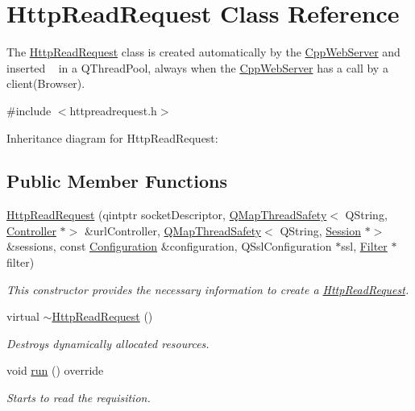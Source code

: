 \hypertarget{class_http_read_request}{}\section{Http\+Read\+Request Class Reference}
\label{class_http_read_request}


The \hyperlink{class_http_read_request}{Http\+Read\+Request} class is created automatically by the \hyperlink{class_cpp_web_server}{Cpp\+Web\+Server} and inserted ~\newline
 in a Q\+Thread\+Pool, always when the \hyperlink{class_cpp_web_server}{Cpp\+Web\+Server} has a call by a client(\+Browser).  




{\ttfamily \#include $<$httpreadrequest.\+h$>$}



Inheritance diagram for Http\+Read\+Request\+:
\subsection*{Public Member Functions}
\begin{DoxyCompactItemize}
\item 
\hyperlink{class_http_read_request_a1b3515d60b21be64bbb3afb7b5b03dcd}{Http\+Read\+Request} (qintptr socket\+Descriptor, \hyperlink{class_q_map_thread_safety}{Q\+Map\+Thread\+Safety}$<$ Q\+String, \hyperlink{class_controller}{Controller} $\ast$$>$ \&url\+Controller, \hyperlink{class_q_map_thread_safety}{Q\+Map\+Thread\+Safety}$<$ Q\+String, \hyperlink{class_session}{Session} $\ast$$>$ \&sessions, const \hyperlink{class_configuration}{Configuration} \&configuration, Q\+Ssl\+Configuration $\ast$ssl, \hyperlink{class_filter}{Filter} $\ast$filter)
\begin{DoxyCompactList}\small\item\em This constructor provides the necessary information to create a \hyperlink{class_http_read_request}{Http\+Read\+Request}. \end{DoxyCompactList}\item 
\mbox{\label{class_http_read_request_a876bcf62d5428d982c5af6f35e59b963}} 
virtual \hyperlink{class_http_read_request_a876bcf62d5428d982c5af6f35e59b963}{$\sim$\+Http\+Read\+Request} ()
\begin{DoxyCompactList}\small\item\em Destroys dynamically allocated resources. \end{DoxyCompactList}\item 
\mbox{\label{class_http_read_request_a8db91de80ce8e83a3b89758a22eec5c3}} 
void \hyperlink{class_http_read_request_a8db91de80ce8e83a3b89758a22eec5c3}{run} () override
\begin{DoxyCompactList}\small\item\em Starts to read the requisition. \end{DoxyCompactList}\end{DoxyCompactItemize}


